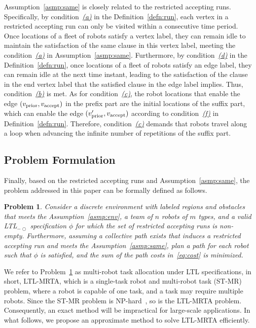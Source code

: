 \documentclass[Afour,sageh,times]{sagej}
\newtheorem{problem}{Problem}
\newcommand{\ltl}{ {\it LTL}$_{-\bigcirc}$ }
\newcommand{\vertex}[1]{v_{\textup{#1}}}
\begin{document}
Assumption~\ref{asmp:same} is closely related to the restricted accepting runs. Specifically, by condition~\hyperref[cond:a]{\it (a)} in the Definition~\ref{defn:run}, each vertex in a restricted accepting run can only be visited within a consecutive time period.  Once locations of a fleet of robots satisfy a  vertex label, they can remain idle to maintain the satisfaction of the same clause in this vertex label, meeting the condition~\hyperref[asmp:a]{\it (a)} in Assumption~\ref{asmp:same}. Furthermore, by condition~\hyperref[cond:d]{\it (d)} in the Definition~\ref{defn:run}, once locations of a fleet of  robots satisfy an edge label, they can remain idle at the next time instant, leading to the satisfaction of the clause in the end vertex label that the satisfied clause in the edge label implies. Thus, condition~\hyperref[asmp:b]{\it (b)} is  met. As for condition~\hyperref[asmp:c]{\it (c)}, the robot locations that enable the edge $(\vertex{prior}, \vertex{accept})$ in the prefix part are the initial locations of the suffix part, which can enable the edge  $(\vertex{prior}', \vertex{accept})$ according to condition~\hyperref[cond:f]{\it (f)} in Definition~\ref{defn:run}. Therefore, condition~\hyperref[asmp:c]{\it (c)} demands that robots travel along a loop when advancing the infinite number of repetitions of the suffix part.
\subsection{Problem Formulation}\label{sec:formulation}
Finally, based on the restricted accepting runs and Assumption~\ref{asmp:same}, the problem addressed in this paper can be formally defined as follows.

\begin{problem}\label{prob:1}
  Consider  a discrete environment with labeled regions and obstacles that meets the Assumption~\ref{asmp:env}, a team of $n$ robots of $m$ types, and a valid \ltl specification $\phi$ for which the set of restricted accepting runs is non-empty. Furthermore, assuming a collective path  exists that induces a restricted  accepting run  and meets the Assumption~\ref{asmp:same}, plan a path for each robot such that $\phi$ is satisfied, and the sum of the path costs in~\eqref{eq:cost} is minimized.
\end{problem}

We refer to Problem~\ref{prob:1} as multi-robot task allocation under LTL specifications, in short, LTL-MRTA, which is a single-task robot and multi-robot task (ST-MR) problem, where a robot is capable of one task, and a task may require multiple robots. Since the ST-MR problem is NP-hard~\citep{korsah2013comprehensive,nunes2017taxonomy}, so is the LTL-MRTA problem. Consequently, an exact method will be impractical for large-scale applications. In what follows, we propose an approximate method to solve LTL-MRTA efficiently.
\end{document}
